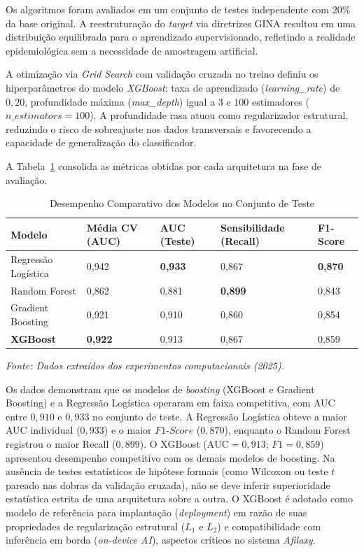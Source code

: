 \documentclass[12pt]{article}
\begin{document}
Os algoritmos foram avaliados em um conjunto de testes independente com 20\% da base original. A reestruturação do \textit{target} via diretrizes GINA resultou em uma distribuição equilibrada para o aprendizado supervisionado, refletindo a realidade epidemiológica sem a necessidade de amostragem artificial.

A otimização via \textit{Grid Search} com validação cruzada no treino definiu os hiperparâmetros do modelo \textit{XGBoost}: taxa de aprendizado (\textit{learning\_rate}) de $0,20$, profundidade máxima (\textit{max\_depth}) igual a $3$ e $100$ estimadores ($n\_estimators=100$). A profundidade rasa atuou como regularizador estrutural, reduzindo o risco de sobreajuste nos dados transversais e favorecendo a capacidade de generalização do classificador.

A Tabela~\ref{tab:metricas_finais} consolida as métricas obtidas por cada arquitetura na fase de avaliação.

\begin{table}[ht!]
\centering
\small
\caption{Desempenho Comparativo dos Modelos no Conjunto de Teste}
\label{tab:metricas_finais}
\vskip 0.1in
\begin{tabularx}{\textwidth}{lXXXX}
\hline
\textbf{Modelo} & \textbf{Média CV (AUC)} & \textbf{AUC (Teste)} & \textbf{Sensibilidade (Recall)} & \textbf{F1-Score} \\ \hline
Regressão Logística & 0,942 & \textbf{0,933} & 0,867 & \textbf{0,870} \\ \hline
Random Forest       & 0,862 & 0,881 & \textbf{0,899} & 0,843 \\ \hline
Gradient Boosting   & 0,921 & 0,910 & 0,860 & 0,854 \\ \hline
\textbf{XGBoost}    & \textbf{0,922} & 0,913 & 0,867 & 0,859 \\ \hline
\end{tabularx}
\vskip 0.05in
\footnotesize{\textit{Fonte: Dados extraídos dos experimentos computacionais (2025).}}
\end{table}

Os dados demonstram que os modelos de \textit{boosting} (XGBoost e Gradient Boosting) e a Regressão Logística operaram em faixa competitiva, com AUC entre $0{,}910$ e $0{,}933$ no conjunto de teste. A Regressão Logística obteve a maior AUC individual ($0{,}933$) e o maior $F1\text{-}Score$ ($0{,}870$), enquanto o Random Forest registrou o maior Recall ($0{,}899$). O XGBoost ($\text{AUC}=0{,}913$; $F1=0{,}859$) apresentou desempenho competitivo com os demais modelos de boosting. Na ausência de testes estatísticos de hipótese formais (como Wilcoxon ou teste $t$ pareado nas dobras da validação cruzada), não se deve inferir superioridade estatística estrita de uma arquitetura sobre a outra. O XGBoost é adotado como modelo de referência para implantação (\textit{deployment}) em razão de suas propriedades de regularização estrutural ($L_1$ e $L_2$) e compatibilidade com inferência em borda (\textit{on-device AI}), aspectos críticos no sistema \textit{Afilaxy}.
\end{document}
